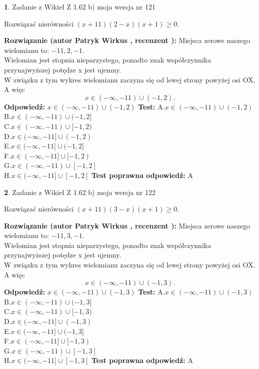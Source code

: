 \documentclass[12pt, a4paper]{article}
\theoremstyle{definition} %
\newtheorem{zad}{}
\newcommand{\zadStart}[1]{\begin{zad}#1\newline}
\newcommand{\zadStop}{\end{zad}}
\newcommand{\rozwStart}[2]{\noindent \textbf{Rozwiązanie (autor #1 , recenzent #2): }\newline}
\newcommand{\rozwStop}{\newline}
\newcommand{\odpStart}{\noindent \textbf{Odpowiedź:}\newline}
\newcommand{\odpStop}{\newline}
\newcommand{\testStart}{\noindent \textbf{Test:}\newline}
\newcommand{\testStop}{\newline}
\newcommand{\kluczStart}{\noindent \textbf{Test poprawna odpowiedź:}\newline}
\newcommand{\kluczStop}{\newline}
\begin{document}
\zadStart{Zadanie z Wikieł Z 1.62 b) moja wersja nr 121}

Rozwiązać nierówności $(x+11)(2-x)(x+1)\ge0$.
\zadStop
\rozwStart{Patryk Wirkus}{}
Miejsca zerowe naszego wielomianu to: $-11, 2, -1$.\\
Wielomian jest stopnia nieparzystego, ponadto znak współczynnika przy\linebreak najwyższej potędze x jest ujemny.\\ W związku z tym wykres wielomianu zaczyna się od lewej strony powyżej osi OX. A więc $$x \in (-\infty,-11) \cup (-1,2).$$
\rozwStop
\odpStart
$x \in (-\infty,-11) \cup (-1,2)$
\odpStop
\testStart
A.$x \in (-\infty,-11) \cup (-1,2)$\\
B.$x \in (-\infty,-11) \cup (-1,2]$\\
C.$x \in (-\infty,-11) \cup [-1,2)$\\
D.$x \in (-\infty,-11] \cup (-1,2)$\\
E.$x \in (-\infty,-11] \cup (-1,2]$\\
F.$x \in (-\infty,-11] \cup [-1,2)$\\
G.$x \in (-\infty,-11) \cup [-1,2]$\\
H.$x \in (-\infty,-11] \cup [-1,2]$
\testStop
\kluczStart
A
\kluczStop



\zadStart{Zadanie z Wikieł Z 1.62 b) moja wersja nr 122}

Rozwiązać nierówności $(x+11)(3-x)(x+1)\ge0$.
\zadStop
\rozwStart{Patryk Wirkus}{}
Miejsca zerowe naszego wielomianu to: $-11, 3, -1$.\\
Wielomian jest stopnia nieparzystego, ponadto znak współczynnika przy\linebreak najwyższej potędze x jest ujemny.\\ W związku z tym wykres wielomianu zaczyna się od lewej strony powyżej osi OX. A więc $$x \in (-\infty,-11) \cup (-1,3).$$
\rozwStop
\odpStart
$x \in (-\infty,-11) \cup (-1,3)$
\odpStop
\testStart
A.$x \in (-\infty,-11) \cup (-1,3)$\\
B.$x \in (-\infty,-11) \cup (-1,3]$\\
C.$x \in (-\infty,-11) \cup [-1,3)$\\
D.$x \in (-\infty,-11] \cup (-1,3)$\\
E.$x \in (-\infty,-11] \cup (-1,3]$\\
F.$x \in (-\infty,-11] \cup [-1,3)$\\
G.$x \in (-\infty,-11) \cup [-1,3]$\\
H.$x \in (-\infty,-11] \cup [-1,3]$
\testStop
\kluczStart
A
\kluczStop
\end{document}
